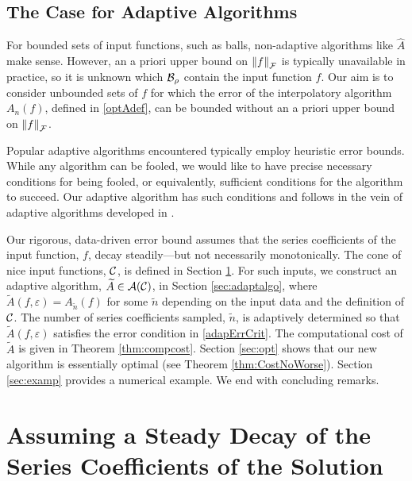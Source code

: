 \documentclass[graybox,footinfo]{svmult}
\newcommand{\DHJRnorm}[2][{}]{\ensuremath{\left \lVert #2 \right \rVert}_{#1}}
\begin{document}
\subsection{The Case for Adaptive Algorithms}
For bounded sets of input functions, such as balls, non-adaptive algorithms like $\widehat{A}$ make sense.  However, an a priori upper bound on $\DHJRnorm[\calF]{f}$ is typically unavailable in practice, so it is unknown which ${\mathcal{B}}_{\rho}$ contain the input function $f$.  Our aim is to consider unbounded sets of $f$ for which the error of the interpolatory algorithm $A_n(f)$, defined in \eqref{optAdef}, can be bounded without an a priori upper bound on $\DHJRnorm[\calF]{f}$.


Popular adaptive algorithms encountered typically employ heuristic error bounds.  While any algorithm can be fooled, we would like to have precise necessary conditions for being fooled, or equivalently, sufficient conditions for the algorithm to succeed.  Our adaptive algorithm has such conditions and follows in the vein of adaptive algorithms developed in \cite{HicEtal14a, HIcEtal14b, HicJim16a, JimHic16a}.

Our rigorous, data-driven error bound assumes that the series coefficients of the input function, $f$, decay steadily---but not necessarily monotonically.  The cone of nice input functions, ${\mathcal{C}}$, is defined in Section \ref{sec:cone}.  For such inputs, we construct an adaptive algorithm, $\widetilde{A} \in {\mathcal{A}}({\mathcal{C}})$, in Section \ref{sec:adaptalgo},  where $\widetilde{A}(f,\varepsilon) = A_{\widetilde{n}}(f)$ for some $\widetilde{n}$ depending on the input data and the definition of ${\mathcal{C}}$.  The number of series coefficients sampled, $\widetilde{n}$, is adaptively determined so that $\widetilde{A}(f,\varepsilon)$ satisfies the error condition in \eqref{adapErrCrit}.  The computational cost of $\widetilde{A}$ is given in  Theorem \ref{thm:compcost}.  Section \ref{sec:opt} shows that our new algorithm is essentially optimal (see Theorem \ref{thm:CostNoWorse}).  Section \ref{sec:examp} provides a numerical example.  We end with concluding remarks. 




\section{Assuming a Steady Decay of the Series Coefficients of the Solution} \label{sec:cone}
\end{document}
